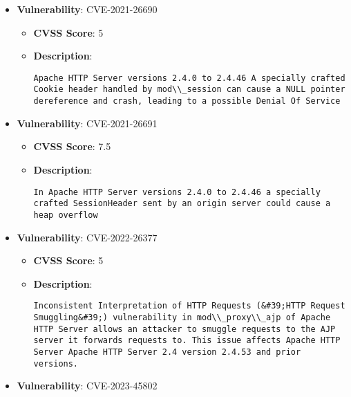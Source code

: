 \documentclass{article}
\begin{document}
\begin{itemize}
        \item \textbf{Vulnerability}: CVE-2021-26690
        \begin{itemize}
            \item \textbf{CVSS Score}:  5 
            \item \textbf{Description}:
            \parbox[t]{0.9\linewidth}{
                \verb|Apache HTTP Server versions 2.4.0 to 2.4.46 A specially crafted Cookie header handled by mod\\_session can cause a NULL pointer dereference and crash, leading to a possible Denial Of Service|
            }
        \end{itemize}
    
        \item \textbf{Vulnerability}: CVE-2021-26691
        \begin{itemize}
            \item \textbf{CVSS Score}:  7.5 
            \item \textbf{Description}:
            \parbox[t]{0.9\linewidth}{
                \verb|In Apache HTTP Server versions 2.4.0 to 2.4.46 a specially crafted SessionHeader sent by an origin server could cause a heap overflow|
            }
        \end{itemize}
    
        \item \textbf{Vulnerability}: CVE-2022-26377
        \begin{itemize}
            \item \textbf{CVSS Score}:  5 
            \item \textbf{Description}:
            \parbox[t]{0.9\linewidth}{
                \verb|Inconsistent Interpretation of HTTP Requests (&#39;HTTP Request Smuggling&#39;) vulnerability in mod\\_proxy\\_ajp of Apache HTTP Server allows an attacker to smuggle requests to the AJP server it forwards requests to. This issue affects Apache HTTP Server Apache HTTP Server 2.4 version 2.4.53 and prior versions.|
            }
        \end{itemize}
    
        \item \textbf{Vulnerability}: CVE-2023-45802
\end{itemize}
\end{document}
